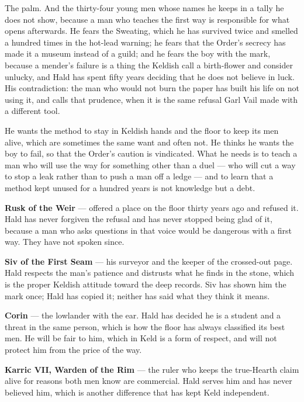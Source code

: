 \documentclass{design/chronicle}
\begin{document}
{
The palm. And the thirty-four young men whose names he keeps in a tally he does not show, because a man who teaches the first way is responsible for what opens afterwards. He fears the Sweating, which he has survived twice and smelled a hundred times in the hot-lead warning; he fears that the Order’s secrecy has made it a museum instead of a guild; and he fears the boy with the mark, because a mender’s failure is a thing the Keldish call a birth-flower and consider unlucky, and Hald has spent fifty years deciding that he does not believe in luck. His contradiction: the man who would not burn the paper has built his life on not using it, and calls that prudence, when it is the same refusal Garl Vail made with a different tool.

He wants the method to stay in Keldish hands and the floor to keep its men alive, which are sometimes the same want and often not. He thinks he wants the boy to fail, so that the Order’s caution is vindicated. What he needs is to teach a man who will use the way for something other than a duel — who will cut a way to stop a leak rather than to push a man off a ledge — and to learn that a method kept unused for a hundred years is not knowledge but a debt.

\textbf{Rusk of the Weir} — offered a place on the floor thirty years ago and refused it. Hald has never forgiven the refusal and has never stopped being glad of it, because a man who asks questions in that voice would be dangerous with a first way. They have not spoken since.

\textbf{Siv of the First Seam} — his surveyor and the keeper of the crossed-out page. Hald respects the man’s patience and distrusts what he finds in the stone, which is the proper Keldish attitude toward the deep records. Siv has shown him the mark once; Hald has copied it; neither has said what they think it means.

\textbf{Corin} — the lowlander with the ear. Hald has decided he is a student and a threat in the same person, which is how the floor has always classified its best men. He will be fair to him, which in Keld is a form of respect, and will not protect him from the price of the way.

\textbf{Karric VII, Warden of the Rim} — the ruler who keeps the true-Hearth claim alive for reasons both men know are commercial. Hald serves him and has never believed him, which is another difference that has kept Keld independent.

}
\end{document}
